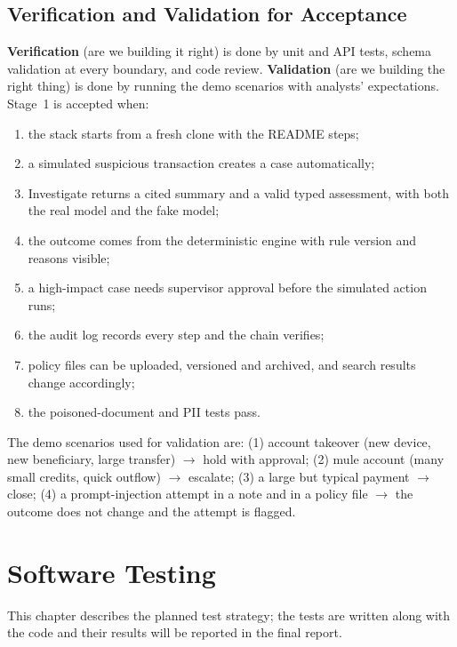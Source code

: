 \documentclass[oneside,a4paper,12pt]{report}
\begin{document}
\section{Verification and Validation for Acceptance}
\textbf{Verification} (are we building it right) is done by unit and API tests, schema validation at every boundary, and code review. \textbf{Validation} (are we building the right thing) is done by running the demo scenarios with analysts' expectations. Stage~1 is accepted when:
\begin{enumerate}
  \item the stack starts from a fresh clone with the README steps;
  \item a simulated suspicious transaction creates a case automatically;
  \item Investigate returns a cited summary and a valid typed assessment, with both the real model and the fake model;
  \item the outcome comes from the deterministic engine with rule version and reasons visible;
  \item a high-impact case needs supervisor approval before the simulated action runs;
  \item the audit log records every step and the chain verifies;
  \item policy files can be uploaded, versioned and archived, and search results change accordingly;
  \item the poisoned-document and PII tests pass.
\end{enumerate}
The demo scenarios used for validation are: (1) account takeover (new device, new beneficiary, large transfer) $\rightarrow$ hold with approval; (2) mule account (many small credits, quick outflow) $\rightarrow$ escalate; (3) a large but typical payment $\rightarrow$ close; (4) a prompt-injection attempt in a note and in a policy file $\rightarrow$ the outcome does not change and the attempt is flagged.

\chapter{Software Testing}
This chapter describes the planned test strategy; the tests are written along with the code and their results will be reported in the final report.
\end{document}
